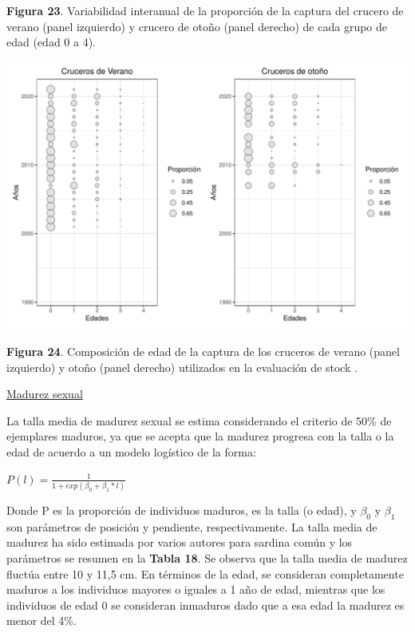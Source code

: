 \documentclass[
  spanish,
]{article}
\begin{document}
\vspace{-0.5cm}
\small

\textbf{Figura 23}. Variabilidad interanual de la proporción de la
captura del crucero de verano (panel izquierdo) y crucero de otoño
(panel derecho) de cada grupo de edad (edad 0 a 4). \normalsize

\begin{center}\includegraphics{FigurasInforme_Marzo/Fig24_datComp-1} \end{center}

\vspace{-0.5cm}
\small

\textbf{Figura 24}. Composición de edad de la captura de los cruceros de
verano (panel izquierdo) y otoño (panel derecho) utilizados en la
evaluación de stock . \vspace{0.5cm} \normalsize

\underline{Madurez sexual}

La talla media de madurez sexual se estima considerando el criterio de
50\% de ejemplares maduros, ya que se acepta que la madurez progresa con
la talla o la edad de acuerdo a un modelo logístico de la forma:

\vspace{0.5cm}
\Large
\begin{center} 
$P(l)=\frac{1}{1+exp(\beta_0 + \beta_1*l)}$
\end{center}
\vspace{0.5cm}

\normalsize

Donde P es la proporción de individuos maduros, es la talla (o edad), y
\(\beta_0\) y \(\beta_1\) son parámetros de posición y pendiente,
respectivamente. La talla media de madurez ha sido estimada por varios
autores para sardina común y los parámetros se resumen en la
\textbf{Tabla 18}. Se observa que la talla media de madurez fluctúa
entre 10 y 11,5 cm. En términos de la edad, se consideran completamente
maduros a los individuos mayores o iguales a 1 año de edad, mientras que
los individuos de edad 0 se consideran inmaduros dado que a esa edad la
madurez es menor del 4\%.
\end{document}
